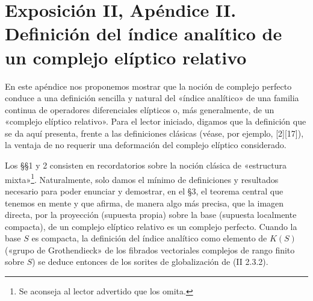 \providecommand{\sisi}[2]{#2}

\providecommand{\cO}{\mathcal O}
\providecommand{\cE}{\mathscr E}
\providecommand{\cF}{\mathscr F}
\providecommand{\cG}{\mathscr G}
\providecommand{\cH}{\mathcal H}
\providecommand{\cL}{\mathscr L}
\providecommand{\cP}{\mathscr P}
\providecommand{\cM}{\mathscr M}
\providecommand{\cD}{\mathcal D}
\providecommand{\R}{\mathbb R}
\providecommand{\C}{\mathbb C}
\providecommand{\N}{\mathbb N}
\providecommand{\Zell}{\mathbb Z_\ell}
\providecommand{\Qell}{\mathbb Q_\ell}
\providecommand{\C}{\mathbb C}
\providecommand{\Ch}{\operatorname{Ch}}
\providecommand{\Sym}{\operatorname{Sym}}
\providecommand{\Td}{\operatorname{Td}}
\providecommand{\Diff}{\operatorname{Diff}}
\providecommand{\Homop}{\operatorname{Hom}}
\providecommand{\Spec}{\operatorname{Spec}}
\providecommand{\pr}{\operatorname{pr}}
\providecommand{\ind}{\operatorname{ind}}
\providecommand{\soft}{\operatorname{soft}}
\providecommand{\Ban}{\operatorname{Ban}}
\providecommand{\Lop}{\operatorname{L}}
\providecommand{\im}{\operatorname{Im}}
\providecommand{\Parf}{\operatorname{Parf}}
\providecommand{\id}{\operatorname{id}}

\newpage
\section*{Exposición II, Apéndice II. Definición del índice analítico de un complejo elíptico relativo}

En este apéndice nos proponemos mostrar que la noción de complejo perfecto conduce a una definición sencilla y natural del «índice analítico» de una familia continua de operadores diferenciales elípticos o, más generalmente, de un «complejo elíptico relativo». Para el lector iniciado, digamos que la definición que se da aquí presenta, frente a las definiciones clásicas (véase, por ejemplo, [2][17]), la ventaja de no requerir una deformación del complejo elíptico considerado.

Los §§1 y 2 consisten en recordatorios sobre la noción clásica de «estructura mixta»\footnote{Se aconseja al lector advertido que los omita.}. Naturalmente, solo damos el mínimo de definiciones y resultados necesario para poder enunciar y demostrar, en el §3, el teorema central que tenemos en mente y que afirma, de manera algo más precisa, que la imagen directa, por la proyección (supuesta propia) sobre la base (supuesta localmente compacta), de un complejo elíptico relativo es un complejo perfecto. Cuando la base $S$ es compacta, la definición del índice analítico como elemento de $K(S)$ («grupo de Grothendieck» de los fibrados vectoriales complejos de rango finito sobre $S$) se deduce entonces de los sorites de globalización de (II 2.3.2).

